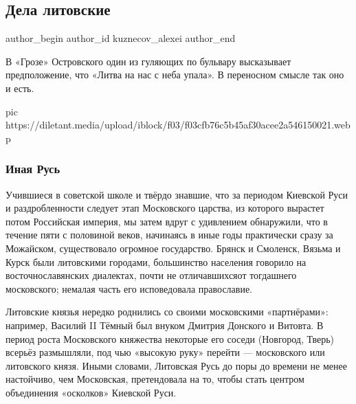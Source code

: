  
 
 
 
 
 
\subsection{Дела литовские}
\label{sec:22_10_2020.sites.ru.diletant_media.kuznecov_alexei.1.dela_litovskie}
\ifcmt
	author_begin
   author_id kuznecov_alexei
	author_end
\fi


В «Грозе» Островского один из гуляющих по бульвару высказывает предположение,
что «Литва на нас с неба упала». В переносном смысле так оно и есть.

\ifcmt
pic https://diletant.media/upload/iblock/f03/f03cfb76c5b45af30acee2a546150021.webp
\fi

\subsubsection{Иная Русь}

Учившиеся в советской школе и твёрдо знавшие, что за периодом Киевской Руси и
раздробленности следует этап Московского царства, из которого вырастет потом
Российская империя, мы затем вдруг с удивлением обнаружили, что в течение пяти
с половиной веков, начинаясь в иные годы практически сразу за Можайском,
существовало огромное государство. Брянск и Смоленск, Вязьма и Курск были
литовскими городами, большинство населения говорило на восточнославянских
диалектах, почти не отличавшихсяот тогдашнего московского; немалая часть его
исповедовала православие.

Литовские князья нередко роднились со своими московскими «партнёрами»:
например, Василий II Тёмный был внуком Дмитрия Донского и Витовта. В период
роста Московского княжества некоторые его соседи (Новгород, Тверь) всерьёз
размышляли, под чью «высокую руку» перейти — московского или литовского князя.
Иными словами, Литовская Русь до поры до времени не менее настойчиво, чем
Московская, претендовала на то, чтобы стать центром объединения «осколков»
Киевской Руси. 

